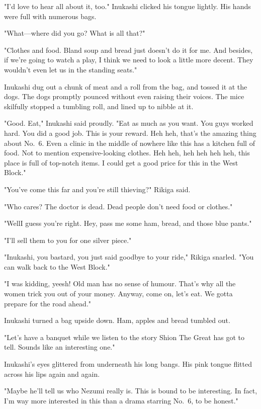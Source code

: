 "I'd love to hear all about it, too." Inukashi clicked his tongue
lightly. His hands were full with numerous bags.

"What---where did you go? What is all that?"

"Clothes and food. Bland soup and bread just doesn't do it for me. And
besides, if we're going to watch a play, I think we need to look a
little more decent. They wouldn't even let us in the standing seats."

Inukashi dug out a chunk of meat and a roll from the bag, and tossed it
at the dogs. The dogs promptly pounced without even raising their
voices. The mice skilfully stopped a tumbling roll, and lined up to
nibble at it.

"Good. Eat," Inukashi said proudly. "Eat as much as you want. You guys
worked hard. You did a good job. This is your reward. Heh heh, that's
the amazing thing about No.~6. Even a clinic in the middle of nowhere
like this has a kitchen full of food. Not to mention expensive-looking
clothes. Heh heh, heh heh heh heh, this place is full of top-notch
items. I could get a good price for this in the West Block."

"You've come this far and you're still thieving?" Rikiga said.

"Who cares? The doctor is dead. Dead people don't need food or clothes."

"Well\el I guess you're right. Hey, pass me some ham, bread, and those
blue pants."

"I'll sell them to you for one silver piece."

"Inukashi, you bastard, you just said goodbye to your ride," Rikiga
snarled. "You can walk back to the West Block."

"I was kidding, yeesh! Old man has no sense of humour. That's why all
the women trick you out of your money. Anyway, come on, let's eat. We
gotta prepare for the road ahead."

Inukashi turned a bag upside down. Ham, apples and bread tumbled out.

"Let's have a banquet while we listen to the story Shion The Great has
got to tell. Sounds like an interesting one."

Inukashi's eyes glittered from underneath his long bangs. His pink
tongue flitted across his lips again and again.

"Maybe he'll tell us who Nezumi really is. This is bound to be
interesting. In fact, I'm way more interested in this than a drama
starring No.~6, to be honest."

